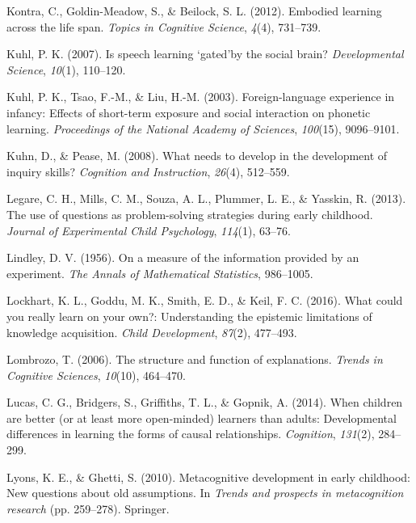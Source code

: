 \documentclass[english,floatsintext,man]{apa6}
\theoremstyle{definition}
\theoremstyle{definition}
\theoremstyle{definition}
\theoremstyle{remark}
\begin{document}
\hypertarget{ref-kontra2012embodied}{}
Kontra, C., Goldin-Meadow, S., \& Beilock, S. L. (2012). Embodied
learning across the life span. \emph{Topics in Cognitive Science},
\emph{4}(4), 731--739.

\hypertarget{ref-kuhl2007speech}{}
Kuhl, P. K. (2007). Is speech learning `gated'by the social brain?
\emph{Developmental Science}, \emph{10}(1), 110--120.

\hypertarget{ref-kuhl2003foreign}{}
Kuhl, P. K., Tsao, F.-M., \& Liu, H.-M. (2003). Foreign-language
experience in infancy: Effects of short-term exposure and social
interaction on phonetic learning. \emph{Proceedings of the National
Academy of Sciences}, \emph{100}(15), 9096--9101.

\hypertarget{ref-kuhn2008needs}{}
Kuhn, D., \& Pease, M. (2008). What needs to develop in the development
of inquiry skills? \emph{Cognition and Instruction}, \emph{26}(4),
512--559.

\hypertarget{ref-legare2013use}{}
Legare, C. H., Mills, C. M., Souza, A. L., Plummer, L. E., \& Yasskin,
R. (2013). The use of questions as problem-solving strategies during
early childhood. \emph{Journal of Experimental Child Psychology},
\emph{114}(1), 63--76.

\hypertarget{ref-lindley1956measure}{}
Lindley, D. V. (1956). On a measure of the information provided by an
experiment. \emph{The Annals of Mathematical Statistics}, 986--1005.

\hypertarget{ref-lockhart2016could}{}
Lockhart, K. L., Goddu, M. K., Smith, E. D., \& Keil, F. C. (2016). What
could you really learn on your own?: Understanding the epistemic
limitations of knowledge acquisition. \emph{Child Development},
\emph{87}(2), 477--493.

\hypertarget{ref-lombrozo2006structure}{}
Lombrozo, T. (2006). The structure and function of explanations.
\emph{Trends in Cognitive Sciences}, \emph{10}(10), 464--470.

\hypertarget{ref-lucas2014children}{}
Lucas, C. G., Bridgers, S., Griffiths, T. L., \& Gopnik, A. (2014). When
children are better (or at least more open-minded) learners than adults:
Developmental differences in learning the forms of causal relationships.
\emph{Cognition}, \emph{131}(2), 284--299.

\hypertarget{ref-lyons2010metacognitive}{}
Lyons, K. E., \& Ghetti, S. (2010). Metacognitive development in early
childhood: New questions about old assumptions. In \emph{Trends and
prospects in metacognition research} (pp. 259--278). Springer.
\end{document}
